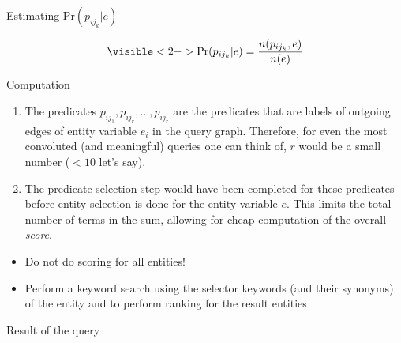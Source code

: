 \documentclass[pdf,11pt]{beamer}
\begin{document}
\begin{frame}{Estimating $\text{Pr}(p_{ij_{k}}| e)$}

\begin{align*}
\visible<2->{\text{Pr}(p_{ij_{k}}| e) = \frac{n(p_{ij_{k}}, e)}{n(e)}}
\end{align*}


\end{frame}

\begin{frame}{Computation}

\begin{enumerate}
  \item<2-> The predicates $p_{ij_1}, p_{ij_r}, ..., p_{ij_r}$ are the predicates that are labels of outgoing edges of entity variable $e_i$ in the query graph. Therefore, for even the most convoluted (and meaningful) queries one can think of, $r$ would be a small number ($< 10$ let's say).
  \item<3-> The predicate selection step would have been completed for these predicates before entity selection is done for the entity variable $e$. This limits the total number of terms in the sum, allowing for cheap computation of the overall \emph{score}.
\end{enumerate}


\begin{itemize}
\item<4-> Do not do scoring for all entities!
\item<5-> Perform a keyword search using the selector keywords (and their synonyms) of the entity and to perform ranking for the result entities
\end{itemize}

\end{frame}

\begin{frame}{Result of the query}



\vspace{11pt}


\vspace{11pt}


\end{frame}
\end{document}
